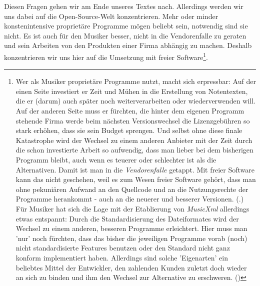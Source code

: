 Diesen Fragen gehen wir am Ende unseres Textes nach. Allerdings werden wir uns
dabei auf die Open-Source-Welt konzentrieren. Mehr oder minder konstenintensive
proprietäre Programme mögen beliebt sein, notwendig sind sie nicht. Es ist auch
für den Musiker besser, nicht in die Vendorenfalle zu geraten und sein Arbeiten
von den Produkten einer Firma abhängig zu machen. Deshalb konzentrieren wir uns
hier auf die Umsetzung mit freier Software\footnote{Wer als Musiker proprietäre
Programme nutzt, macht sich erpressbar: Auf der einen Seite investiert er Zeit
und Mühen in die Erstellung von Notentexten, die er (darum) auch später noch
weiterverarbeiten oder wiederverwenden will. Auf der anderen Seite muss er
fürchten, die hinter dem eigenen Programm stehende Firma werde beim nächsten
Versionswechsel die Lizenzgebühren so stark erhöhen, dass sie sein Budget
sprengen. Und selbst ohne diese finale Katastrophe wird der Wechsel zu einem
anderen Anbieter mit der Zeit durch die schon investierte Arbeit so aufwendig,
dass man lieber bei dem bisherigen Programm bleibt, auch wenn es teuerer oder
schlechter ist als die Alternativen. Damit ist man in die \textit{Vendorenfalle}
getappt. Mit freier Software kann das nicht geschehen, weil es zum Wesen freier
Software gehört, dass man ohne pekuniären Aufwand an den Quellcode und an die
Nutzungsrechte der Programme herankommt - auch an die neuerer und besserer
Versionen. (\cite[vgl. dazu][\nopage wp]{FSF2018a}.) Für Musiker hat sich die
Lage mit der Etablierung von \textit{MusicXml} allerdings etwas entspannt: Durch
die Standardisierung des Dateiformates wird der Wechsel zu einem anderen,
besseren Programme erleichtert. Hier muss man 'nur' noch fürchten, dass das
bisher die jeweiligen Programme vorab (noch) nicht standardisierte Features
benutzen oder den Standard nicht ganz konform implementiert haben. Allerdings
sind solche 'Eigenarten' ein beliebtes Mittel der Entwickler, den zahlenden
Kunden zuletzt doch wieder an sich zu binden und ihm den Wechsel zur Alternative
zu erschweren. (\cite[Zur Lizenzierung von MusicXml vgl. auch][\nopage
wp.]{WpedMusicXML2018a})}.


